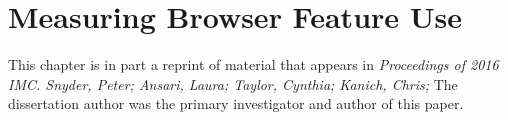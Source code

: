 \chapter{Measuring Browser Feature Use}
\label{measurement}

This chapter is in part a reprint of material that appears in
\textit{Proceedings of 2016 IMC. Snyder, Peter; Ansari, Laura; Taylor,
Cynthia; Kanich, Chris;} The dissertation author was the primary investigator and
author of this paper.







